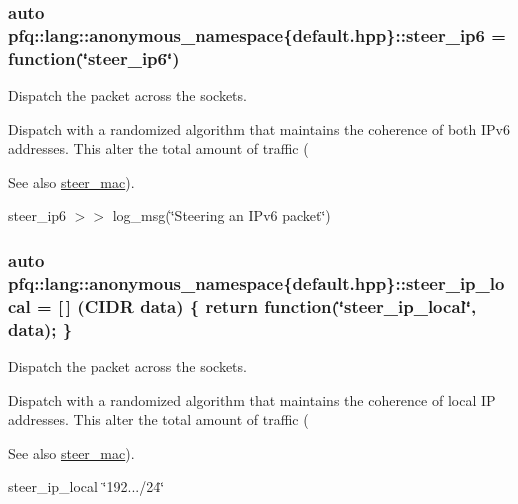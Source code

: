 \subsubsection[{\texorpdfstring{steer\+\_\+ip6}{steer_ip6}}]{\setlength{\rightskip}{0pt plus 5cm}auto pfq\+::lang\+::anonymous\+\_\+namespace\{default.\+hpp\}\+::steer\+\_\+ip6 = {\bf function}(\char`\"{}steer\+\_\+ip6\char`\"{})}\hypertarget{namespacepfq_1_1lang_1_1anonymous__namespace_02default_8hpp_03_a02291b124a4aa900d78797e386517f69}{}\label{namespacepfq_1_1lang_1_1anonymous__namespace_02default_8hpp_03_a02291b124a4aa900d78797e386517f69}


Dispatch the packet across the sockets. 

Dispatch with a randomized algorithm that maintains the coherence of both I\+Pv6 addresses. This alter the total amount of traffic (\begin{DoxySeeAlso}{See also}
\hyperlink{namespacepfq_1_1lang_1_1anonymous__namespace_02default_8hpp_03_ad51e91e3b485c729ac1ba39a46e337a0}{steer\+\_\+mac}).
\end{DoxySeeAlso}
steer\+\_\+ip6 $>$$>$ log\+\_\+msg(\char`\"{}\+Steering an I\+Pv6 packet\char`\"{}) 
\subsubsection[{\texorpdfstring{steer\+\_\+ip\+\_\+local}{steer_ip_local}}]{\setlength{\rightskip}{0pt plus 5cm}auto pfq\+::lang\+::anonymous\+\_\+namespace\{default.\+hpp\}\+::steer\+\_\+ip\+\_\+local = \mbox{[}$\,$\mbox{]} ({\bf C\+I\+DR} data) \{ return {\bf function}(\char`\"{}steer\+\_\+ip\+\_\+local\char`\"{}, data); \}}\hypertarget{namespacepfq_1_1lang_1_1anonymous__namespace_02default_8hpp_03_a573c7621db324727daedc11fd27ab709}{}\label{namespacepfq_1_1lang_1_1anonymous__namespace_02default_8hpp_03_a573c7621db324727daedc11fd27ab709}


Dispatch the packet across the sockets. 

Dispatch with a randomized algorithm that maintains the coherence of local IP addresses. This alter the total amount of traffic (\begin{DoxySeeAlso}{See also}
\hyperlink{namespacepfq_1_1lang_1_1anonymous__namespace_02default_8hpp_03_ad51e91e3b485c729ac1ba39a46e337a0}{steer\+\_\+mac}).
\end{DoxySeeAlso}
steer\+\_\+ip\+\_\+local \char`\"{}192.../24\char`\"{} 
